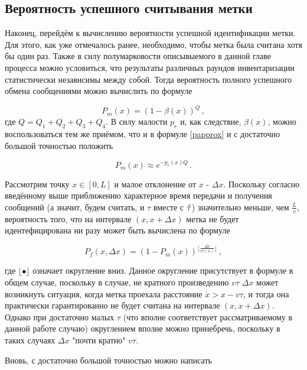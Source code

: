 \documentclass[12pt]{article}
\theoremstyle{definition}
\begin{document}
\subsection{Вероятность успешного считывания метки}
\label{sec:ch24}

Наконец, перейдём к вычислению вероятности успешной идентификации метки. Для этого, как уже отмечалось ранее, необходимо, чтобы метка была считана хотя бы один раз. Также в силу полумарковости описывыемого в данной главе процесса можно условиться, что результаты различных раундов инвентаризации статистически независимы между собой. Тогда вероятность полного успешного обмена сообщениями можно вычислить по формуле

\begin{equation}
    P_m(x)=(1-\beta(x))^Q\,,
\end{equation}
где $Q=Q_1+Q_2+Q_3+Q_4$. В силу малости $p_e$ и, как следствие, $\beta(x)$, можно воспользоваться тем же приёмом, что и в формуле \eqref{papprox} и с достаточно большой точностью положить

\begin{equation}
\label{P_m}
    P_m(x)\approx e^{-p_e(x)Q}\,.
\end{equation}

Рассмотрим точку $x\in[0,L]$ и малое отклонение от $x$ - $\Delta x$. Поскольку согласно введённому выше приближению характерное время передачи и получения сообщений (а значит, будем считать, и $\tau$ вместе с $\Tilde{\tau}$) значительно меньше, чем $\frac{L}{v}$, вероятность того, что на интервале $(x,x+\Delta x)$ метка не будет идентефицирована ни разу может быть вычислена по формуле

\begin{equation}
    P_f(x,\Delta x) = (1-P_m(x))^{\lfloor \frac{\Delta x}{v\tau(x)}\rfloor}\,,
\end{equation}

где $\lfloor\bullet\rfloor$ означает округление вниз. Данное округление присутствует в формуле в общем случае, поскольку в случае, не кратного произведению $v\tau$ $\Delta x$ может возникнуть ситуация, когда метка проехала расстояние $\acute{x}>x-v\tau$, и тогда она практически гарантированно не будет считана на интервале $(x,x+\Delta x)$. Однако при достаточно малых $\tau$ (что вполне соответствует рассматриваемому в данной работе случаю) округлением вполне можно принебречь, поскольку в таких случаях $\Delta x$ "почти кратно" $v\tau$.

Вновь, с достаточно большой точностью можно написать
\end{document}

